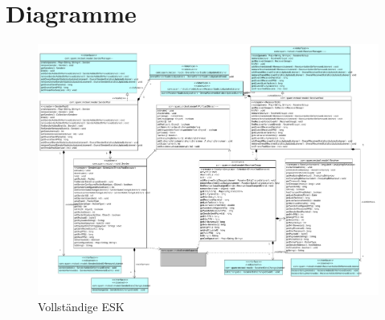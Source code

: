 \chapter{Diagramme}

\begin{figure}[H]
\center
\includegraphics[width=19cm,angle=90]{images/model_detail.pdf}
\caption{Vollständige ESK}
\end{figure}